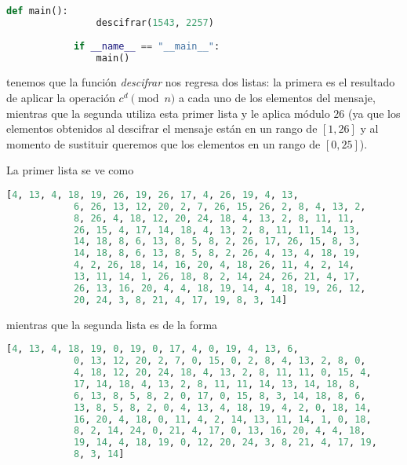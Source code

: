 \documentclass[letterpaper,11pt]{article}
\begin{document}
\begin{enumerate}
\begin{enumerate}
\begin{itemize}
\begin{lstlisting}[language=Python]
            def main():
                descifrar(1543, 2257)
            
            if __name__ == "__main__":
                main()
            \end{lstlisting}
            
            tenemos que la función \textit{descifrar} nos regresa dos listas:
            la primera es el resultado de aplicar la operación $c^{d} \pmod{n}$
            a cada uno de los elementos del mensaje, mientras que la segunda
            utiliza esta primer lista y le aplica módulo $26$ (ya que los
            elementos obtenidos al descifrar el mensaje están en un rango de 
            $[1,26]$ y al momento de sustituir queremos que los elementos en un
            rango de $[0,25]$). 
            
            La primer lista se ve como
            \begin{lstlisting}[language=Python]
            [4, 13, 4, 18, 19, 26, 19, 26, 17, 4, 26, 19, 4, 13, 
            6, 26, 13, 12, 20, 2, 7, 26, 15, 26, 2, 8, 4, 13, 2, 
            8, 26, 4, 18, 12, 20, 24, 18, 4, 13, 2, 8, 11, 11, 
            26, 15, 4, 17, 14, 18, 4, 13, 2, 8, 11, 11, 14, 13, 
            14, 18, 8, 6, 13, 8, 5, 8, 2, 26, 17, 26, 15, 8, 3, 
            14, 18, 8, 6, 13, 8, 5, 8, 2, 26, 4, 13, 4, 18, 19, 
            4, 2, 26, 18, 14, 16, 20, 4, 18, 26, 11, 4, 2, 14, 
            13, 11, 14, 1, 26, 18, 8, 2, 14, 24, 26, 21, 4, 17, 
            26, 13, 16, 20, 4, 4, 18, 19, 14, 4, 18, 19, 26, 12, 
            20, 24, 3, 8, 21, 4, 17, 19, 8, 3, 14]
            \end{lstlisting}
            
            mientras que la segunda lista es de la forma
            \begin{lstlisting}[language=Python]
            [4, 13, 4, 18, 19, 0, 19, 0, 17, 4, 0, 19, 4, 13, 6, 
            0, 13, 12, 20, 2, 7, 0, 15, 0, 2, 8, 4, 13, 2, 8, 0, 
            4, 18, 12, 20, 24, 18, 4, 13, 2, 8, 11, 11, 0, 15, 4, 
            17, 14, 18, 4, 13, 2, 8, 11, 11, 14, 13, 14, 18, 8, 
            6, 13, 8, 5, 8, 2, 0, 17, 0, 15, 8, 3, 14, 18, 8, 6, 
            13, 8, 5, 8, 2, 0, 4, 13, 4, 18, 19, 4, 2, 0, 18, 14, 
            16, 20, 4, 18, 0, 11, 4, 2, 14, 13, 11, 14, 1, 0, 18, 
            8, 2, 14, 24, 0, 21, 4, 17, 0, 13, 16, 20, 4, 4, 18, 
            19, 14, 4, 18, 19, 0, 12, 20, 24, 3, 8, 21, 4, 17, 19, 
            8, 3, 14]
            \end{lstlisting}
            

\end{itemize}
\end{enumerate}
\end{enumerate}
\end{document}
